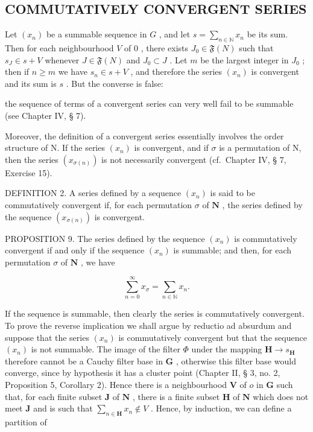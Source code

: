 \subsection{COMMUTATIVELY CONVERGENT SERIES}

Let \((x_{n})\) be a summable sequence in \(G\) , and let \(s = \sum_{n\in \mathbb{N}}x_n\) be its sum. Then for each neighbourhood \(V\) of \(0\) , there exists \(J_0\in \mathfrak{F}(N)\) such that \(s_J\in s + V\) whenever \(J\in \mathfrak{F}(N)\) and \(J_0\subset J\) . Let \(m\) be the largest integer in \(J_0\) ; then if \(n\geqslant m\) we have \(s_n\in s + V\) , and therefore the series \((x_{n})\) is convergent and its sum is \(s\) . But the converse is false:

the sequence of terms of a convergent series can very well fail to be summable (see Chapter IV, § 7).

Moreover, the definition of a convergent series essentially involves the order structure of N. If the series \((x_{n})\) is convergent, and if \(\sigma\) is a permutation of N, then the series \((x_{\sigma(n)})\) is not necessarily convergent (cf.~Chapter IV, § 7, Exercise 15).

DEFINITION 2. A series defined by a sequence \((x_{n})\) is said to be commutatively convergent if, for each permutation \(\sigma\) of \(\mathbf{N}\) , the series defined by the sequence \((x_{\sigma(n)})\) is convergent.

PROPOSITION 9. The series defined by the sequence \((x_{n})\) is commutatively convergent if and only if the sequence \((x_{n})\) is summable; and then, for each permutation \(\sigma\) of \(\mathbf{N}\) , we have

\[
\sum_ {n = 0} ^ {\infty} x _ {\sigma} = \sum_ {n \in \mathbb {N}} x _ {n}.
\]

If the sequence is summable, then clearly the series is commutatively convergent. To prove the reverse implication we shall argue by reductio ad absurdum and suppose that the series \((x_{n})\) is commutatively convergent but that the sequence \((x_{n})\) is not summable. The image of the filter \(\Phi\) under the mapping \(\mathbf{H} \to s_{\mathbf{H}}\) therefore cannot be a Cauchy filter base in \(\mathbf{G}\) , otherwise this filter base would converge, since by hypothesis it has a cluster point (Chapter II, § 3, no. 2, Proposition 5, Corollary 2). Hence there is a neighbourhood \(\mathbf{V}\) of \(o\) in \(\mathbf{G}\) such that, for each finite subset \(\mathbf{J}\) of \(\mathbf{N}\) , there is a finite subset \(\mathbf{H}\) of \(\mathbf{N}\) which does not meet \(\mathbf{J}\) and is such that \(\sum_{n \in \mathbf{H}} x_{n} \notin V\) . Hence, by induction, we can define a partition of


